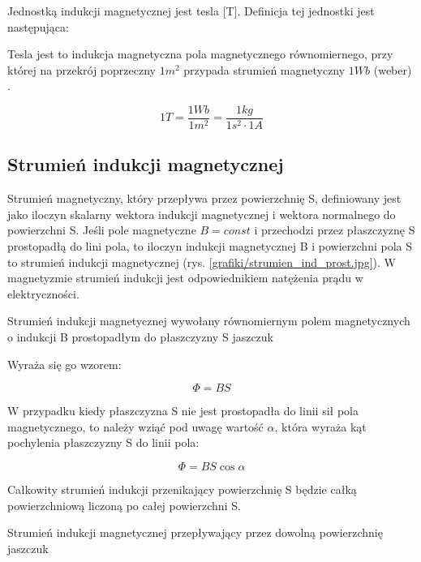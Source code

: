 Jednostką indukcji magnetycznej jest tesla [T]. Definicja tej jednostki jest następująca:

\begin{defn}
	Tesla jest to indukcja magnetyczna pola magnetycznego równomiernego, przy której na przekrój poprzeczny $ 1 m^2 $ przypada strumień magnetyczny $ 1 Wb $ (weber) \cite{kaluszko}.
\end{defn}

\begin{equation} \label{eq:indmag5}
	1 T = \frac{1 Wb}{1 m^2} = \frac{1 kg}{1 s^2 \cdot 1 A}
\end{equation}

\subsection{Strumień indukcji magnetycznej}

Strumień magnetyczny, który przepływa przez powierzchnię S, definiowany jest jako iloczyn skalarny wektora indukcji magnetycznej i wektora normalnego do powierzchni S. Jeśli pole magnetyczne $ B = const $ i przechodzi przez płaszczyznę S prostopadłą do lini pola, to iloczyn indukcji magnetycznej B i powierzchni pola S to strumień indukcji magnetycznej (rys. \ref{grafiki/strumien_ind_prost.jpg}). W magnetyzmie strumień indukcji jest odpowiednikiem natężenia prądu w elektryczności. 

	   {Strumień indukcji magnetycznej wywołany równomiernym polem magnetycznych o indukcji B prostopadłym do płaszczyzny S}
	   {jaszczuk}
	   
Wyraża się go wzorem:

\begin{equation} \label{eq:strindmag1}
	\Phi = B S
\end{equation}

W przypadku kiedy płaszczyzna S nie jest prostopadła do linii sił pola magnetycznego, to należy wziąć pod uwagę wartość $ \alpha $, która wyraża kąt pochylenia płaszczyzny S do linii pola:

\begin{equation} \label{eq:strindmag2}
	\Phi = B S \cos{\alpha}
\end{equation}

Całkowity strumień indukcji przenikający powierzchnię S będzie całką powierzchniową liczoną po całej powierzchni S.

	   {Strumień indukcji magnetycznej przepływający przez dowolną powierzchnię}
	   {jaszczuk}
	   
